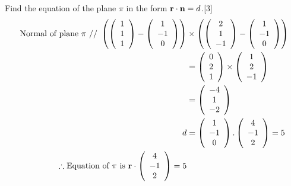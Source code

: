 \documentclass[12pt, a4 paper]{article}
\begin{document}
\begin{outline}[enumerate]
					\2 Find the equation of the plane $\pi $ in the form ${\bf{r}} \cdot {\bf{n}} = d$.\hfill[3]
					\color{blue}
					\begin{align*}
						{\textrm{Normal of plane }}\pi {\textrm{ // }}\left( {\left( {\begin{array}{*{20}{c}}1 \\1\\1\end{array}} \right) - \left( {\begin{array}{*{20}{c}}1\\{ - 1}\\0\end{array}} \right)} \right) &\times \left( {\left( {\begin{array}{*{20}{c}}2\\1\\{ - 1}\end{array}} \right) - \left( {\begin{array}{*{20}{c}}1\\{ - 1}\\0\end{array}} \right)} \right)\\ &= \left( {\begin{array}{*{20}{c}}0\\2\\1\end{array}} \right) \times \left( {\begin{array}{*{20}{c}}1\\2\\{ - 1}\end{array}} \right)\\ &= \left( {\begin{array}{*{20}{c}}{ - 4}\\1\\{ - 2}\end{array}} \right)\\d &= \left( {\begin{array}{*{20}{c}}1\\{ - 1}\\0\end{array}} \right).\left( {\begin{array}{*{20}{c}}4\\{ - 1}\\2\end{array}} \right) = 5\\\therefore {\textrm{Equation of }}\pi {\textrm{ is }}{\bf{r}} \cdot \left( {\begin{array}{*{20}{c}}4\\{ - 1}\\2\end{array}} \right) = 5

\end{align*}
\end{outline}
\end{document}
